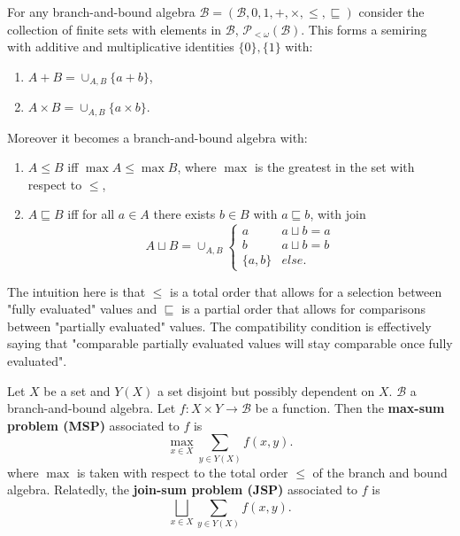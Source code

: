\documentclass[acmsmall,review]{acmart}\settopmatter{printfolios=true,printccs=false,printacmref=false}
\begin{document}
\begin{example}
  For any branch-and-bound algebra $\mathcal B = (\mathcal B, 0, 1, +, \times, \leq, \sqsubseteq)$ consider the collection of finite sets with elements in $\mathcal B$, $\mathcal P_{<\omega} (\mathcal B)$. This forms a semiring with additive and multiplicative identities $\{0\}, \{1\}$ with:
  \begin{enumerate}
    \item $A + B = \cup_{A,B} \{a+b\}$,
    \item $A \times B = \cup_{A,B} \{a \times b\}$.
  \end{enumerate}
  Moreover it becomes a branch-and-bound algebra with:
  \begin{enumerate}
    \item $A \leq B$ iff $\max A \leq \max B$, where $\max$ is the greatest in the set with respect to $\leq$, 
    \item $A \sqsubseteq B$ iff for all $a \in A$ there exists $b \in B$ with $a \sqsubseteq b$, with join 
    \begin{equation}
      A \sqcup B = \cup_{A,B} \begin{cases}
        a & a \sqcup b = a \\ 
        b & a \sqcup b = b \\
        \{a,b\} & else.
      \end{cases}
    \end{equation}
  \end{enumerate}
\end{example}

The intuition here is that $\leq$ is a total order that allows for a selection between "fully evaluated" values and $\sqsubseteq$ is a partial order that allows for comparisons between "partially evaluated" values. The compatibility condition is effectively saying that "comparable partially evaluated values will stay comparable once fully evaluated".

\begin{definition}\label{MSP JSP}
  Let $X$ be a set and $Y(X)$ a set disjoint but possibly dependent on $X$. $\mathcal B$ a branch-and-bound algebra. Let $f : X \times Y \to \mathcal B$ be a function. Then the \textbf{max-sum problem (MSP)} associated to $f$ is
  \begin{equation}\label{MSP}
    \max_{x \in X} \sum_{y \in Y(X)} f(x,y).
  \end{equation}
  where $\max$ is taken with respect to the total order $\leq$ of the branch and bound algebra. Relatedly, the \textbf{join-sum problem (JSP)} associated to $f$ is 
  \begin{equation}\label{JSP}
    \bigsqcup_{x \in X} \sum_{y \in Y(X)} f(x,y).
  \end{equation}
\end{definition}
\end{document}

